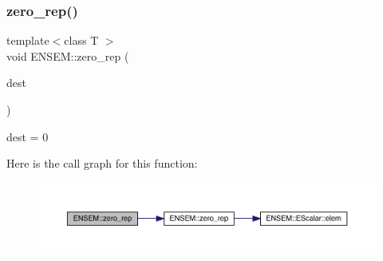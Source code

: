 \subsubsection{\texorpdfstring{zero\_rep()}{zero\_rep()}}
{\footnotesize\ttfamily template$<$class T $>$ \\
void E\+N\+S\+E\+M\+::zero\+\_\+rep (\begin{DoxyParamCaption}\item[{\mbox{\hyperlink{classENSEM_1_1PSeed}{P\+Seed}}$<$ T $>$ \&}]{dest }\end{DoxyParamCaption})\hspace{0.3cm}{\ttfamily [inline]}}



dest = 0 

Here is the call graph for this function\+:\nopagebreak
\begin{figure}[H]
\begin{center}
\leavevmode
\includegraphics[width=350pt]{df/d3c/group__primseed_ga7f820f9e98c02626f49ea005894fdc65_cgraph}
\end{center}
\end{figure}
